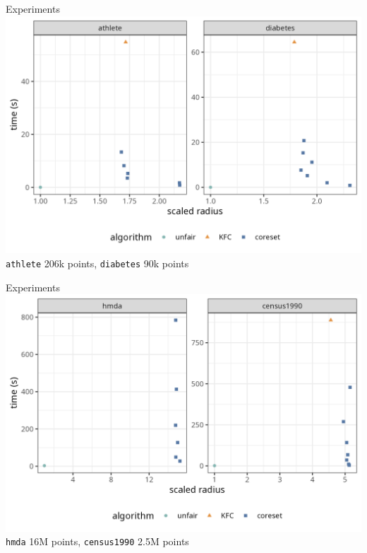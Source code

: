 \documentclass{beamer}
\begin{document}
\begin{frame}{Experiments}
	\centering
	\includegraphics[width=\textwidth]{figs/time-vs-radius-k32-small.png}
	\texttt{athlete} 206k points,
	\texttt{diabetes} 90k points
\end{frame}

\begin{frame}{Experiments}
	\centering
	\includegraphics[width=\textwidth]{figs/time-vs-radius-k32-larger.png}
	\texttt{hmda} 16M points,
	\texttt{census1990} 2.5M points
\end{frame}
\end{document}
